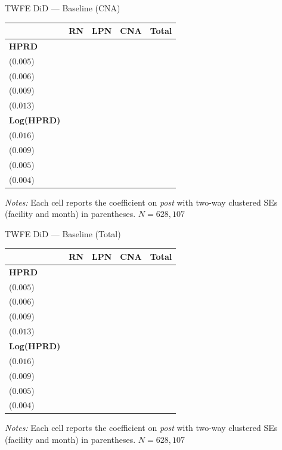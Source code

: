 \documentclass{beamer}
\newcommand{\hlest}[3]{%
  {\setlength{\fboxsep}{1.2pt}\colorbox{yellow}{\est{#1}{#2}{#3}}}%
}
\newcommand{\sym}[1]{\rlap{$^{#1}$}}
\newcommand{\est}[3]{\makecell[c]{#1\sym{#3}\\ \footnotesize(#2)}}
\begin{document}
\begin{frame}{TWFE DiD --- Baseline (CNA)}
\small
\centering
\renewcommand{\arraystretch}{1.15}
\setlength{\tabcolsep}{8pt}

\begin{threeparttable}
\begin{tabular}{@{} l cccc @{}}
\toprule
 & \textbf{RN} & \textbf{LPN} & \textbf{CNA} & \textbf{Total} \\
\midrule
\textbf{HPRD} &
\est{$-0.032$}{$0.005$}{***} &
\est{$\phantom{-}0.000$}{$0.006$}{} &
\hlest{$-0.054$}{$0.009$}{***} &
\est{$-0.086$}{$0.013$}{***} \\
\textbf{Log(HPRD)} &
\est{$-0.092$}{$0.016$}{***} &
\est{$\phantom{-}0.003$}{$0.009$}{} &
\hlest{$-0.028$}{$0.005$}{***} &
\est{$-0.026$}{$0.004$}{***} \\
\bottomrule
\end{tabular}

\begin{tablenotes}[flushleft]
\footnotesize
\item \textit{Notes:} Each cell reports the coefficient on \textit{post} with two-way clustered SEs (facility and month) in parentheses. $N=628{,}107$
\end{tablenotes}
\end{threeparttable}
\end{frame}

\begin{frame}{TWFE DiD --- Baseline (Total)}
\small
\centering
\renewcommand{\arraystretch}{1.15}
\setlength{\tabcolsep}{8pt}

\begin{threeparttable}
\begin{tabular}{@{} l cccc @{}}
\toprule
 & \textbf{RN} & \textbf{LPN} & \textbf{CNA} & \textbf{Total} \\
\midrule
\textbf{HPRD} &
\est{$-0.032$}{$0.005$}{***} &
\est{$\phantom{-}0.000$}{$0.006$}{} &
\est{$-0.054$}{$0.009$}{***} &
\hlest{$-0.086$}{$0.013$}{***} \\
\textbf{Log(HPRD)} &
\est{$-0.092$}{$0.016$}{***} &
\est{$\phantom{-}0.003$}{$0.009$}{} &
\est{$-0.028$}{$0.005$}{***} &
\hlest{$-0.026$}{$0.004$}{***} \\
\bottomrule
\end{tabular}

\begin{tablenotes}[flushleft]
\footnotesize
\item \textit{Notes:} Each cell reports the coefficient on \textit{post} with two-way clustered SEs (facility and month) in parentheses. $N=628{,}107$
\end{tablenotes}
\end{threeparttable}
\end{frame}
\end{document}
